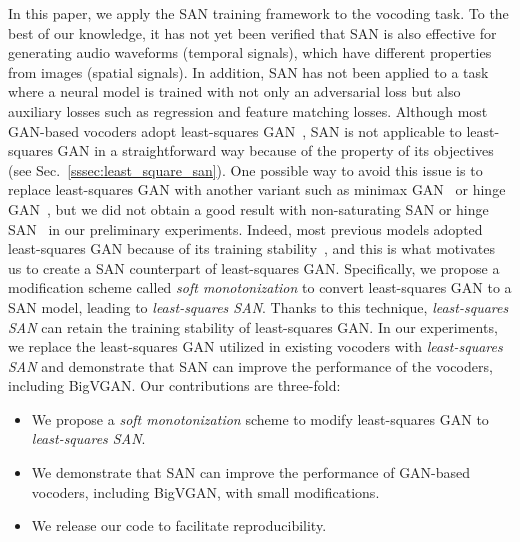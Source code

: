 \documentclass{article}
\begin{document}
In this paper, we apply the SAN training framework to the vocoding task. To the best of our knowledge, it has not yet been verified that SAN is also effective for generating audio waveforms (temporal signals), which have different properties from images (spatial signals). In addition, SAN has not been applied to a task where a neural model is trained with not only an adversarial loss but also auxiliary losses such as regression and feature matching losses. Although most GAN-based vocoders adopt least-squares GAN~\cite{mao2017least}, SAN is not applicable to least-squares GAN in a straightforward way because of the property of its objectives (see Sec.~\ref{sssec:least_square_san}). One possible way to avoid this issue is to replace least-squares GAN with another variant such as minimax GAN~\cite{goodfellow2014generative} or hinge GAN~\cite{lim2017geometric}, but we did not obtain a good result with non-saturating SAN or hinge SAN~\cite{takida2023san} in our preliminary experiments. Indeed, most previous models adopted least-squares GAN because of its training stability~\cite{bollepalli2017generative,pascual17segan,yamamoto2020parallel,kong2020hifigan}, and this is what motivates us to create a SAN counterpart of least-squares GAN. Specifically, we propose a modification scheme called \textit{soft monotonization} to convert least-squares GAN to a SAN model, leading to \textit{least-squares SAN}. Thanks to this technique, \textit{least-squares SAN} can retain the training stability of least-squares GAN. In our experiments, we replace the least-squares GAN utilized in existing vocoders with \textit{least-squares SAN} and demonstrate that SAN can improve the performance of the vocoders, including BigVGAN.
Our contributions are three-fold:
\begin{itemize}
    \setlength{\leftskip}{-15pt}
    \item We propose a \textit{soft monotonization} scheme to modify least-squares GAN to \textit{least-squares SAN}.
    \item We demonstrate that SAN can improve the performance of GAN-based vocoders, including BigVGAN, with small modifications.
    \item We release our code to facilitate reproducibility.
\end{itemize}
\end{document}
